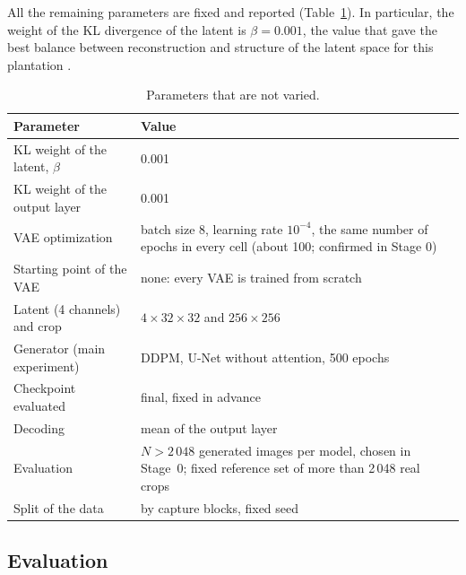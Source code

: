 All the remaining parameters are fixed and reported (Table~\ref{tab:fixed}). In particular, the weight of the KL divergence of the latent is $\beta=0.001$, the value that gave the best balance between reconstruction and structure of the latent space for this plantation \cite{XieLi2025VAE}.

\begin{table}[H]
\centering
\small
\begin{tabular}{p{}p{}}
\hline
\textbf{Parameter} & \textbf{Value} \\
\hline
KL weight of the latent, $\beta$ & 0.001 \cite{XieLi2025VAE} \\
KL weight of the output layer & 0.001 \\
VAE optimization & batch size 8, learning rate $10^{-4}$, the same number of epochs in every cell (about 100; confirmed in Stage 0) \\
Starting point of the VAE & none: every VAE is trained from scratch \\
Latent (4 channels) and crop & $4\times32\times32$ and $256\times256$ \\
Generator (main experiment) & DDPM, U-Net without attention, 500 epochs \\
Checkpoint evaluated & final, fixed in advance \\
Decoding & mean of the output layer \\
Evaluation & $N>2\,048$ generated images per model, chosen in Stage~0; fixed reference set of more than 2\,048 real crops \\
Split of the data & by capture blocks, fixed seed \\
\hline
\end{tabular}
\caption{Parameters that are not varied.}
\label{tab:fixed}
\end{table}

\subsection{Evaluation}

